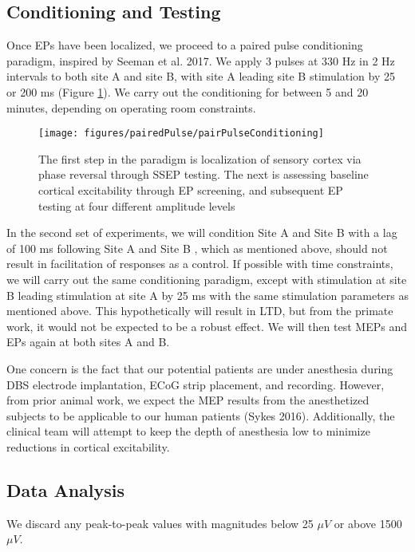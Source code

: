 \subsection{Conditioning and Testing}
Once EPs have been localized, we proceed to a paired pulse conditioning paradigm, inspired by Seeman et al. 2017. We apply 3 pulses at 330 Hz in 2 Hz intervals to both site A and site B, with site A leading site B stimulation by 25 or 200 ms (Figure \ref{fig:pairedPulseConditioning}). We carry out the conditioning for between 5 and 20 minutes, depending on operating room constraints.

\begin{figure}[ht]
	\centering
	\texttt{[image: figures/pairedPulse/pairPulseConditioning]}
	\caption[Different Paired Pulse Conditioning Protocols]{The first step in the paradigm is localization of sensory cortex via phase reversal through SSEP testing. The next is assessing baseline cortical excitability through EP screening, and subsequent EP testing at four different amplitude levels}
	\label{fig:pairedPulseConditioning}
\end{figure}


In the second set of experiments, we will condition Site A and Site B with a lag of 100 ms following Site A and Site B , which as mentioned above, should not result in facilitation of responses as a control. If possible with time constraints, we will carry out the same conditioning paradigm, except with stimulation at site B leading stimulation at site A by 25 ms with the same stimulation parameters as mentioned above. This hypothetically will result in LTD, but from the primate work, it would not be expected to be a robust effect. We will then test MEPs and EPs again at both sites A and B. 

One concern is the fact that our potential patients are under anesthesia during DBS electrode implantation, ECoG strip placement, and recording. However, from prior animal work, we expect the MEP results from the anesthetized subjects to be applicable to our human patients (Sykes 2016). Additionally, the clinical team will attempt to keep the depth of anesthesia low to minimize reductions in cortical excitability. 

\subsection{Data Analysis}

We discard any peak-to-peak values with magnitudes below 25 $ \mu V $ or above 1500 $ \mu V $. 


